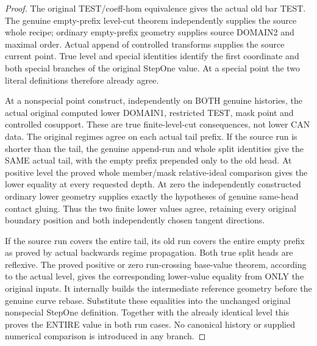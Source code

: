 \begin{proof}
The original TEST/coeff-hom equivalence gives the actual old bar TEST.
The genuine empty-prefix level-cut theorem independently supplies the
source whole recipe; ordinary empty-prefix geometry supplies source
DOMAIN2 and maximal order. Actual append of controlled transforms supplies
the source current point. True level and special identities identify the
first coordinate and both special branches of the original StepOne value.
At a special point the two literal definitions therefore already agree.

At a nonspecial point construct, independently on BOTH genuine histories,
the actual original computed lower DOMAIN1, restricted TEST, mask point
and controlled cosupport. These are true finite-level-cut consequences,
not lower CAN data. The original regimes agree on each actual tail prefix.
If the source run is shorter than the tail, the genuine append-run and
whole split identities give the SAME actual tail, with the empty prefix
prepended only to the old head. At positive level the proved whole
member/mask relative-ideal comparison gives the lower equality at every
requested depth. At zero the independently constructed ordinary lower
geometry supplies exactly the hypotheses of genuine same-head contact
gluing. Thus the two finite lower values agree, retaining every original
boundary position and both independently chosen tangent directions.

If the source run covers the entire tail, its old run covers the entire
empty prefix as proved by actual backwards regime propagation. Both
true split heads are reflexive. The proved positive or zero run-crossing
base-value theorem, according to the actual level, gives the corresponding
lower-value equality from ONLY the original inputs. It internally builds
the intermediate reference geometry before the genuine curve rebase.
Substitute these equalities into the unchanged original nonspecial
StepOne definition. Together with the already identical level this proves
the ENTIRE value in both run cases. No canonical history or supplied
numerical comparison is introduced in any branch.
\end{proof}

